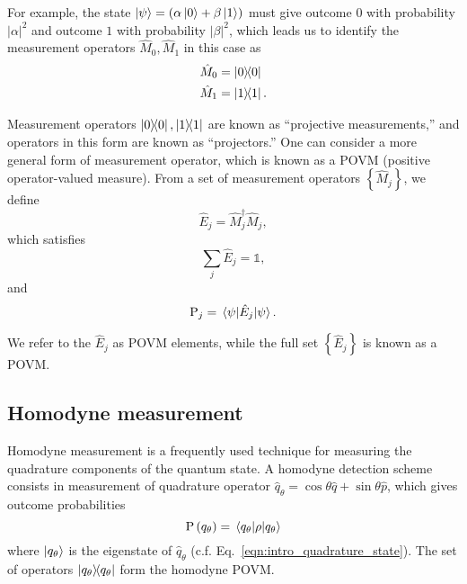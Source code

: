 \noindent For example, the state $\ket{\psi} = \left(\alpha\ket{0}  + \beta\ket{1}\right)$ must give outcome $0$ with probability $\left|\alpha\right|^2$ and outcome $1$ with probability $\left|\beta\right|^2$, which leads us to identify the measurement operators $\hat{M}_0, \hat{M}_1$ in this case as
\begin{align*}
&\hat{M}_0 = \dyad{0} \\
&\hat{M}_1 = \dyad{1}.
\end{align*}

\noindent Measurement operators $\dyad{0}, \dyad{1}$ are known as ``projective measurements,'' and operators in this form are known as ``projectors.'' One can consider a more general form of measurement operator, which is known as a POVM (positive operator-valued measure). From a set of measurement operators $\left\{\hat{M}_j\right\}$, we define
\begin{equation}
\hat{E}_j = \hat{M}^\dagger_j \hat{M}_j,
\end{equation}
which satisfies
\begin{equation}
\sum_j \hat{E}_j = \mathds{1},
\end{equation}
and
\begin{equation}
\text{P}_j = \ev{\hat{E}_j}{\psi}.
\end{equation}

\noindent We refer to the $\hat{E}_j$ as POVM elements, while the full set $\left\{\hat{E}_j\right\}$ is known as a POVM.



\FloatBarrier
\subsection{Homodyne measurement}\label{sec:intro_homodyne}
Homodyne measurement is a frequently used technique for measuring the quadrature components of the quantum state. A homodyne detection scheme consists in measurement of quadrature operator $\hat{q}_\theta = \cos\theta \hat{q} + \sin\theta \hat{p}$, which gives outcome probabilities
\begin{equation}
\text{P}\left(q_\theta\right) = \ev{\rho}{q_\theta}
\end{equation}
where $\ket{q_\theta}$ is the eigenstate of $\hat{q}_\theta$ (c.f. Eq.~\ref{eqn:intro_quadrature_state}).%
The set of operators $\dyad{q_\theta}$ form the homodyne POVM.


